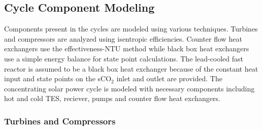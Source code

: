 





\subsection{Cycle Component Modeling}
Components present in the cycles are modeled using various techniques. Turbines and compressors are analyzed using isentropic efficiencies. Counter flow heat exchangers use the effectiveness-NTU method while black box heat exchangers use a simple energy balance for state point calculations. The lead-cooled fast reactor is assumed to be a black box heat exchanger because of the constant heat input and state points on the sCO$_2$ inlet and outlet are provided. The concentrating solar power cycle is modeled with necessary components including hot and cold TES, reciever, pumps and counter flow heat exchangers.


\subsubsection{Turbines and Compressors }

